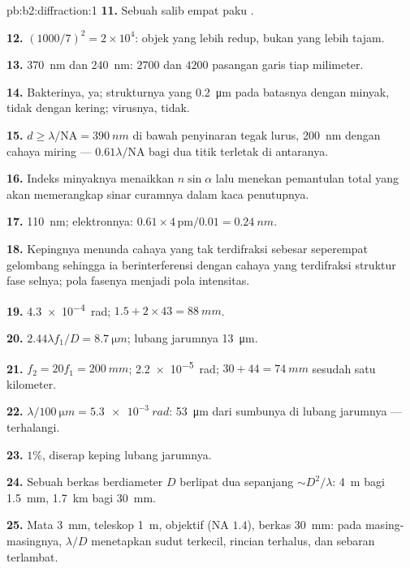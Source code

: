 \begin{solution}{pb:b2:diffraction:1}
\textbf{11.} Sebuah salib empat paku .

\textbf{12.} $(1000/7)^2 = 2 \times 10^4$: objek yang lebih redup, bukan yang lebih tajam.

\textbf{13.} \qty{370}{nm} dan \qty{240}{nm}: $2700$ dan $4200$ pasangan garis tiap
milimeter.

\textbf{14.} Bakterinya, ya; strukturnya yang \qty{0.2}{\micro m} pada batasnya
dengan minyak, tidak dengan kering; virusnya, tidak.

\textbf{15.} $d \ge \lambda/\mathrm{NA} = \qty{390}{nm}$ di bawah penyinaran tegak lurus, \qty{200}{nm}
dengan cahaya miring --- $0.61\lambda/\mathrm{NA}$ bagi dua titik terletak di antaranya.

\textbf{16.} Indeks minyaknya menaikkan $n\sin\alpha$ lalu menekan pemantulan
total yang akan memerangkap sinar curamnya dalam kaca penutupnya.

\textbf{17.} \qty{110}{nm}; elektronnya: $0.61 \times 4\,\text{pm}/0.01 = \qty{0.24}{nm}$.

\textbf{18.} Kepingnya menunda cahaya yang tak terdifraksi sebesar seperempat gelombang
sehingga ia berinterferensi dengan cahaya yang terdifraksi struktur fase
selnya; pola fasenya menjadi pola intensitas.

\textbf{19.} \qty{4.3e-4}{rad}; $1.5 + 2 \times 43 = \qty{88}{mm}$.

\textbf{20.} $2.44\lambda f_1/D = \qty{8.7}{\micro m}$; lubang jarumnya \qty{13}{\micro m}.

\textbf{21.} $f_2 = 20f_1 = \qty{200}{mm}$; \qty{2.2e-5}{rad}; $30 + 44 = \qty{74}{mm}$ sesudah satu
kilometer.

\textbf{22.} $\lambda/\qty{100}{\micro m} = \qty{5.3e-3}{rad}$: \qty{53}{\micro m} dari sumbunya di
lubang jarumnya --- terhalangi.

\textbf{23.} $1\%$, diserap keping lubang jarumnya.

\textbf{24.} Sebuah berkas berdiameter $D$ berlipat dua sepanjang $\sim D^2/\lambda$: \qty{4}{m} bagi
\qty{1.5}{mm}, \qty{1.7}{km} bagi \qty{30}{mm}.

\textbf{25.} Mata \qty{3}{mm}, teleskop \qty{1}{m}, objektif (NA $1.4$), berkas
\qty{30}{mm}: pada masing-masingnya, $\lambda/D$ menetapkan sudut terkecil, rincian terhalus, dan
sebaran terlambat.
\end{solution}
